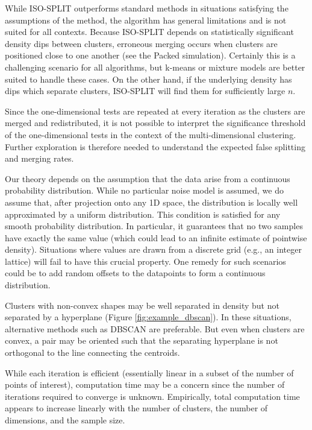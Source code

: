 \documentclass[10pt]{article}
\begin{document}
While ISO-SPLIT outperforms standard methods in situations satisfying the assumptions of the method, the algorithm has general limitations and is not suited for all contexts. Because ISO-SPLIT depends on statistically significant density dips between clusters, erroneous merging occurs when clusters are positioned close to one another (see the Packed simulation). Certainly this is a challenging scenario for all algorithms, but k-means or mixture models are better suited to handle these cases. On the other hand,
if the underlying density has dips which separate clusters, ISO-SPLIT will
find them for sufficiently large $n$.

Since the one-dimensional tests are repeated at every iteration as the clusters are merged and redistributed, it is not possible to interpret the significance threshold of the one-dimensional tests in the context of the multi-dimensional clustering. Further exploration is therefore needed to understand the expected false splitting and merging rates.

Our theory depends on the assumption that the data arise from a continuous probability distribution. While no particular noise model is assumed, we do assume that, after projection onto any 1D space, the distribution is locally well approximated by a uniform distribution. This condition is satisfied for any smooth probability distribution. In particular, it guarantees that no two samples have exactly the same value (which could lead to an infinite estimate of pointwise density). Situations where values are drawn from a discrete grid (e.g., an integer lattice) will fail to have this crucial property. One remedy for such scenarios could be to add random offsets to the datapoints to form a continuous distribution.

Clusters with non-convex shapes may be well separated in density but not separated by a hyperplane (Figure \ref{fig:example_dbscan}). In these situations, alternative methods such as DBSCAN are preferable. But even when clusters are convex, a pair may be oriented such that the separating hyperplane is not orthogonal to the line connecting the centroids.

While each iteration is efficient (essentially linear in a subset of the number of points of interest), computation time may be a concern since the number of iterations required to converge is unknown. Empirically, total computation time appears to increase linearly with the number of clusters, the number of dimensions, and the sample size.
\end{document}
